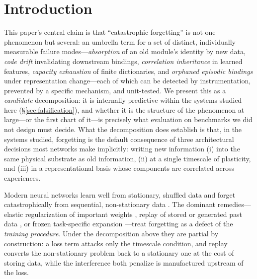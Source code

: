 \documentclass[11pt]{article}
\begin{document}
\section{Introduction}

This paper's central claim is that ``catastrophic forgetting'' is not one
phenomenon but several: an umbrella term for a set of distinct,
individually measurable failure modes---\emph{absorption} of an old
module's identity by new data, \emph{code drift} invalidating downstream
bindings, \emph{correlation inheritance} in learned features,
\emph{capacity exhaustion} of finite dictionaries, and \emph{orphaned
episodic bindings} under representation change---each of which can be
detected by instrumentation, prevented by a specific mechanism, and
unit-tested. We present this as a \emph{candidate} decomposition: it is
internally predictive within the systems studied here (\S\ref{sec:falsification}),
and whether it is the structure of the phenomenon at large---or the first
chart of it---is precisely what evaluation on benchmarks we did not design
must decide. What the decomposition does establish is that, in the systems
studied, forgetting is the default consequence of three architectural
decisions most networks make implicitly: writing new information (i) into
the same physical substrate as old information, (ii) at a single timescale
of plasticity, and (iii) in a representational basis whose components are
correlated across experiences.

Modern neural networks learn well from stationary, shuffled data and forget
catastrophically from sequential, non-stationary data
\cite{french1999,mccloskey1989}. The dominant remedies---elastic
regularization of important weights \cite{kirkpatrick2017,zenke2017},
replay of stored or generated past data \cite{shin2017}, or frozen
task-specific expansion \cite{rusu2016}---treat forgetting as a defect of
the \emph{training procedure}. Under the decomposition above they are
partial by construction: a loss term attacks only the timescale condition,
and replay converts the non-stationary problem back to a stationary one at
the cost of storing data, while the interference both penalize is
manufactured upstream of the loss.
\end{document}
